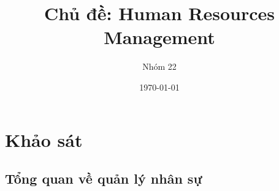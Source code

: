 \documentclass{beamer}
\title[{\makebox[.15\paperwidth]{Human Resources Management}}]{Chủ đề: Human Resources Management}
\author[Nhóm 22]{Nhóm 22}
\date[Data Warehouse \& BI]{\today}
\begin{document}



\section{Khảo sát}
\subsection{Tổng quan về quản lý nhân sự}
\end{document}
